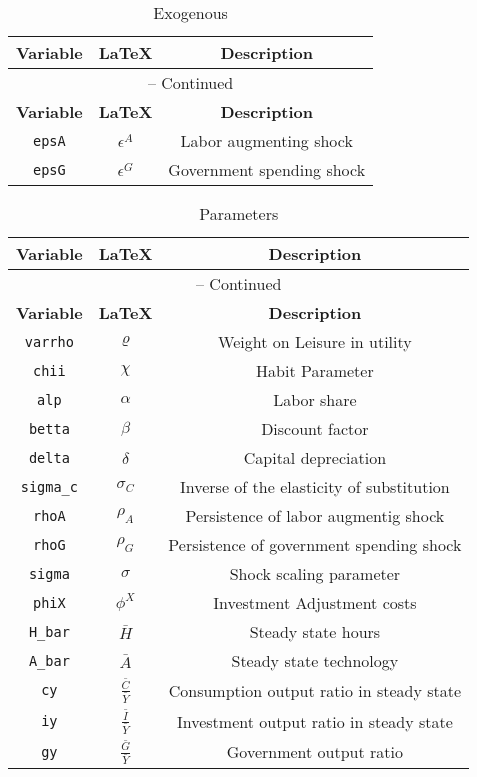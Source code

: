 \begin{center}
\begin{longtable}{ccc}
\caption{Exogenous}\\%
\hline%
\multicolumn{1}{c}{\textbf{Variable}} &
\multicolumn{1}{c}{\textbf{\LaTeX}} &
\multicolumn{1}{c}{\textbf{Description}}\\%
\hline\hline%
\endfirsthead
\multicolumn{3}{c}{{\tablename} \thetable{} -- Continued}\\%
\hline%
\multicolumn{1}{c}{\textbf{Variable}} &
\multicolumn{1}{c}{\textbf{\LaTeX}} &
\multicolumn{1}{c}{\textbf{Description}}\\%
\hline\hline%
\endhead
\texttt{epsA} & ${\epsilon^{A}}$ & Labor augmenting shock\\
\texttt{epsG} & ${\epsilon^{G}}$ & Government spending shock\\
\hline%
\end{longtable}
\end{center}
\begin{center}
\begin{longtable}{ccc}
\caption{Parameters}\\%
\hline%
\multicolumn{1}{c}{\textbf{Variable}} &
\multicolumn{1}{c}{\textbf{\LaTeX}} &
\multicolumn{1}{c}{\textbf{Description}}\\%
\hline\hline%
\endfirsthead
\multicolumn{3}{c}{{\tablename} \thetable{} -- Continued}\\%
\hline%
\multicolumn{1}{c}{\textbf{Variable}} &
\multicolumn{1}{c}{\textbf{\LaTeX}} &
\multicolumn{1}{c}{\textbf{Description}}\\%
\hline\hline%
\endhead
\texttt{varrho} & ${\varrho}$ & Weight on Leisure in utility\\
\texttt{chii} & ${\chi}$ & Habit Parameter\\
\texttt{alp} & ${\alpha}$ & Labor share\\
\texttt{betta} & ${\beta}$ & Discount factor\\
\texttt{delta} & ${\delta}$ & Capital depreciation\\
\texttt{sigma\_c} & ${\sigma_{C}}$ & Inverse of the elasticity of substitution\\
\texttt{rhoA} & ${\rho_{A}}$ & Persistence of labor augmentig shock\\
\texttt{rhoG} & ${\rho_{G}}$ & Persistence of government spending shock\\
\texttt{sigma} & ${\sigma}$ & Shock scaling parameter\\
\texttt{phiX} & ${\phi^X}$ & Investment Adjustment costs\\
\texttt{H\_bar} & $\bar{H}$ & Steady state hours\\
\texttt{A\_bar} & $\bar{A}$ & Steady state technology\\
\texttt{cy} & $\frac{\bar{C}}{\bar{Y}}$ & Consumption output ratio in steady state\\
\texttt{iy} & $\frac{\bar{I}}{\bar{Y}}$ & Investment output ratio in steady state\\
\texttt{gy} & $\frac{\bar{G}}{\bar{Y}}$ & Government output ratio\\
\hline%
\end{longtable}
\end{center}
